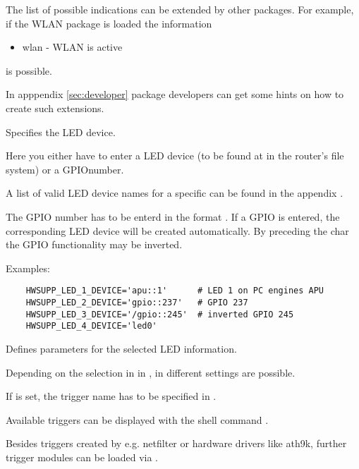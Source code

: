 \begin{description}
  The list of possible indications can be extended by other packages.
  For example, if the WLAN package is loaded the information 
  \begin{itemize}
    \item wlan - WLAN is active
  \end{itemize}
  is possible.

  In apppendix \ref{sec:developer} package developers can get some hints 
  on how to create such extensions. 
  
  Specifies the LED device.

  Here you either have to enter a LED device (to be found at 
  in the router's file system) or a GPIO\footnotemark number.


  A list of valid LED device names for a specific  can be
  found in the appendix .

  The GPIO number has to be enterd in the format .
  If a GPIO is entered, the corresponding LED device will be created
  automatically. By preceding the char \var{/} the GPIO functionality may be inverted.

  Examples:
  \begin{verbatim}
    HWSUPP_LED_1_DEVICE='apu::1'      # LED 1 on PC engines APU
    HWSUPP_LED_2_DEVICE='gpio::237'   # GPIO 237
    HWSUPP_LED_3_DEVICE='/gpio::245'  # inverted GPIO 245
    HWSUPP_LED_4_DEVICE='led0'
  \end{verbatim}

  Defines parameters for the selected LED information.

  Depending on the selection in in , 
  in  different settings are possible.

  If  is set, the trigger name has to be specified
  in .

  Available triggers can be displayed with the shell command 
  . 

  Besides triggers created by e.g. netfilter or hardware drivers like ath9k,
  further trigger modules can be loaded via .


\end{description}

